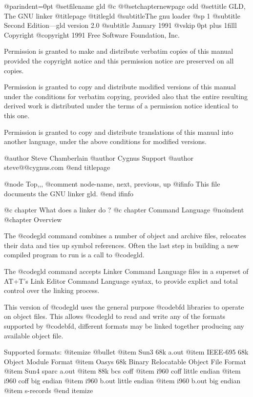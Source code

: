 
@parindent=0pt
@setfilename gld
@c @@setchapternewpage odd
@settitle GLD, The GNU linker
@titlepage
@title{gld}
@subtitle{The gnu loader}
@sp 1
@subtitle Second Edition---gld version 2.0
@subtitle January 1991
@vskip 0pt plus 1filll
Copyright @copyright{} 1991 Free Software Foundation, Inc.

Permission is granted to make and distribute verbatim copies of
this manual provided the copyright notice and this permission notice
are preserved on all copies.

Permission is granted to copy and distribute modified versions of this
manual under the conditions for verbatim copying, provided also that
the entire resulting derived work is distributed under the terms of a
permission notice identical to this one.

Permission is granted to copy and distribute translations of this manual
into another language, under the above conditions for modified versions.

@author {Steve Chamberlain}
@author {Cygnus Support}
@author {steve@@cygnus.com}
@end titlepage

@node Top,,,
@comment  node-name,  next,  previous,  up
@ifinfo
This file documents the GNU linker gld.
@end ifinfo

@c chapter What does a linker do ?
@c chapter Command Language
@noindent
@chapter Overview


The @code{gld} command combines a number of object and archive files,
relocates their data and ties up symbol references. Often the last
step in building a new compiled program to run is a call to @code{gld}.

The @code{gld} command accepts Linker Command Language files in
a superset of AT+T's Link Editor Command Language syntax,
to provide explict and total control over the linking process.

This version of @code{gld} uses the general purpose @code{bfd} libraries
to operate on object files. This allows @code{gld} to read and
write any of the formats supported by @code{bfd}, different
formats may be linked together producing any available object file. 

Supported formats:
@itemize @bullet
@item
Sun3 68k a.out
@item 
IEEE-695 68k Object Module Format
@item 
Oasys 68k Binary Relocatable Object File Format
@item 
Sun4 sparc a.out
@item 
88k bcs coff
@item 
i960 coff little endian
@item 
i960 coff big endian
@item 
i960 b.out little endian
@item 
i960 b.out big endian
@item
s-records
@end itemize
 
